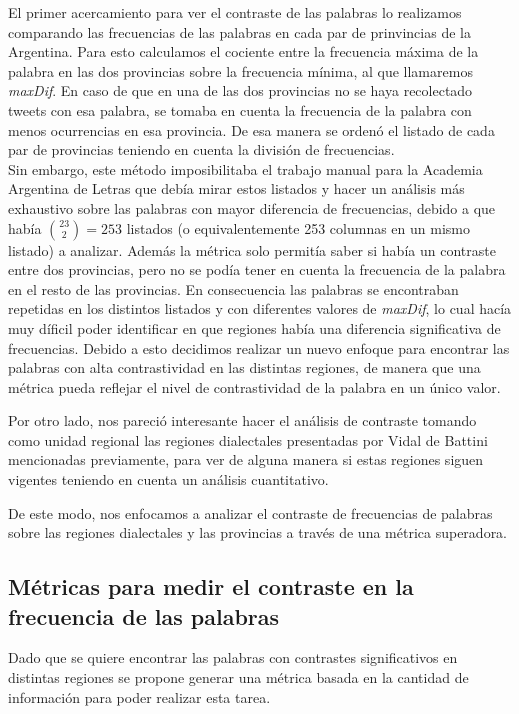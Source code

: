 El primer acercamiento para ver el contraste de las palabras lo realizamos comparando las frecuencias de las palabras 
en cada par de prinvincias de la Argentina. Para esto calculamos el cociente entre la frecuencia máxima de la palabra
en las dos provincias sobre la frecuencia mínima, al que llamaremos \textit{maxDif}. En caso de que en una de las dos provincias no se haya 
recolectado tweets con esa palabra, se tomaba en cuenta la frecuencia de la palabra con menos ocurrencias en esa provincia.
De esa manera se ordenó el listado de cada par de provincias teniendo en cuenta la división de frecuencias. \\
Sin embargo, este método imposibilitaba el trabajo manual para la Academia Argentina de Letras que debía mirar estos listados
y hacer un análisis más exhaustivo sobre las palabras con mayor diferencia de frecuencias, debido a que había $\binom{23}{2} = 253$
listados (o equivalentemente 253 columnas en un mismo listado) a analizar. Además la métrica solo permitía saber si había un contraste entre dos provincias, pero no se podía tener en cuenta la frecuencia de la palabra en el resto de las provincias. 
En consecuencia las palabras se encontraban repetidas en los distintos listados y con diferentes valores de \textit{maxDif}, lo cual hacía muy díficil poder identificar en que regiones había una diferencia significativa de frecuencias. Debido a esto decidimos realizar un nuevo enfoque para encontrar las palabras con alta contrastividad en las distintas regiones, de manera que una métrica pueda reflejar el nivel de contrastividad de la palabra en un único valor.

Por otro lado, nos pareció interesante hacer el análisis de contraste tomando como unidad regional las regiones dialectales presentadas por Vidal de Battini mencionadas previamente, para ver de alguna manera si estas regiones siguen vigentes teniendo en cuenta un análisis cuantitativo. %

De este modo, nos enfocamos a analizar el contraste de frecuencias de palabras sobre las regiones dialectales y las provincias a través de una métrica superadora.

\subsection{Métricas para medir el contraste en la frecuencia de las palabras}
Dado que se quiere encontrar las palabras con contrastes significativos en distintas
regiones se propone generar una métrica basada en la cantidad de información
 para poder realizar esta tarea.
